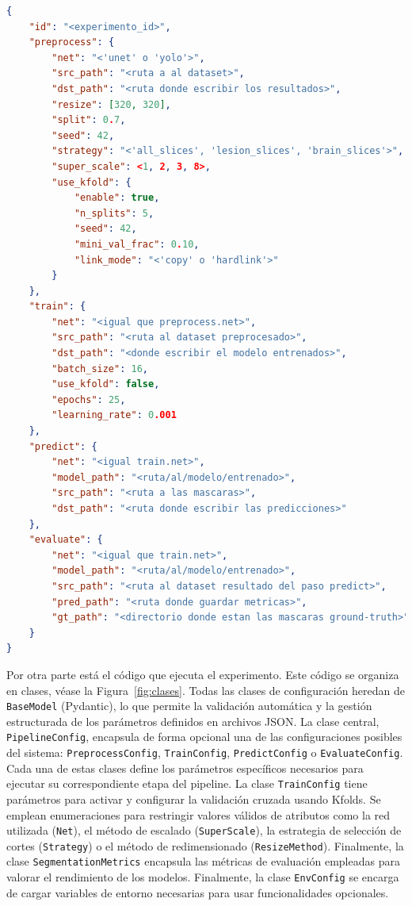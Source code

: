 \documentclass[../main.tex]{subfiles}
\begin{document}
\begin{lstlisting}[language=json, caption={Plantilla de archivo de configuración JSON.}]
{
    "id": "<experimento_id>",
    "preprocess": {
        "net": "<'unet' o 'yolo'>",
        "src_path": "<ruta a al dataset>",
        "dst_path": "<ruta donde escribir los resultados>",
        "resize": [320, 320],
        "split": 0.7,
        "seed": 42,
        "strategy": "<'all_slices', 'lesion_slices', 'brain_slices'>",
        "super_scale": <1, 2, 3, 8>,
        "use_kfold": {
            "enable": true,
            "n_splits": 5,
            "seed": 42,
            "mini_val_frac": 0.10,
            "link_mode": "<'copy' o 'hardlink'>"
        }
    },
    "train": {
        "net": "<igual que preprocess.net>",
        "src_path": "<ruta al dataset preprocesado>",
        "dst_path": "<donde escribir el modelo entrenados>",
        "batch_size": 16,
        "use_kfold": false,
        "epochs": 25,
        "learning_rate": 0.001
    },
    "predict": {
        "net": "<igual train.net>",
        "model_path": "<ruta/al/modelo/entrenado>",
        "src_path": "<ruta a las mascaras>",
        "dst_path": "<ruta donde escribir las predicciones>"
    },
    "evaluate": {
        "net": "<igual que train.net>",
        "model_path": "<ruta/al/modelo/entrenado>",
        "src_path": "<ruta al dataset resultado del paso predict>",
        "pred_path": "<ruta donde guardar metricas>",
        "gt_path": "<directorio donde estan las mascaras ground-truth>"
    }
}
\end{lstlisting}

Por otra parte está el código que ejecuta el experimento. Este código se organiza en clases, véase la Figura~\ref{fig:clases}. Todas las clases de configuración heredan de \texttt{BaseModel} (Pydantic), lo que permite la validación automática y la gestión estructurada de los parámetros definidos en archivos JSON. La clase central, \texttt{PipelineConfig}, encapsula de forma opcional una de las configuraciones posibles del sistema: \texttt{PreprocessConfig}, \texttt{TrainConfig}, \texttt{PredictConfig} o \texttt{EvaluateConfig}. Cada una de estas clases define los parámetros específicos necesarios para ejecutar su correspondiente etapa del pipeline. La clase \texttt{TrainConfig} tiene parámetros para activar y configurar la validación cruzada usando Kfolds. Se emplean enumeraciones para restringir valores válidos de atributos como la red utilizada (\texttt{Net}), el método de escalado (\texttt{SuperScale}), la estrategia de selección de cortes (\texttt{Strategy}) o el método de redimensionado (\texttt{ResizeMethod}). Finalmente, la clase \texttt{SegmentationMetrics} encapsula las métricas de evaluación empleadas para valorar el rendimiento de los modelos. Finalmente, la clase \texttt{EnvConfig} se encarga de cargar variables de entorno necesarias para usar funcionalidades opcionales. %
\end{document}
